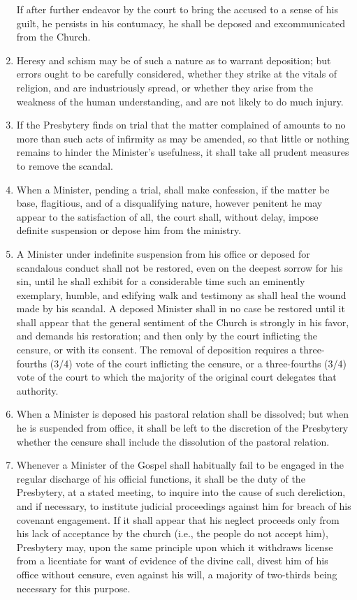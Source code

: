\documentclass[
]{book}
\begin{document}
\begin{enumerate}
  If after further endeavor by the court to bring the accused to a sense of his guilt, he persists in his contumacy, he shall be deposed and excommunicated from the Church.
\item
  Heresy and schism may be of such a nature as to warrant deposition; but errors ought to be carefully considered, whether they strike at the vitals of religion, and are industriously spread, or whether they arise from the weakness of the human understanding, and are not likely to do much injury.
\item
  If the Presbytery finds on trial that the matter complained of amounts to no more than such acts of infirmity as may be amended, so that little or nothing remains to hinder the Minister's usefulness, it shall take all prudent measures to remove the scandal.
\item
  When a Minister, pending a trial, shall make confession, if the matter be base, flagitious, and of a disqualifying nature, however penitent he may appear to the satisfaction of all, the court shall, without delay, impose definite suspension or depose him from the ministry.
\item
  \protect\hypertarget{37.8}{\href{}{}}A Minister under indefinite suspension from his office or deposed for scandalous conduct shall not be restored, even on the deepest sorrow for his sin, until he shall exhibit for a considerable time such an eminently exemplary, humble, and edifying walk and testimony as shall heal the wound made by his scandal. A deposed Minister shall in no case be restored until it shall appear that the general sentiment of the Church is strongly in his favor, and demands his restoration; and then only by the court inflicting the censure, or with its consent. The removal of deposition requires a three-fourths (3/4) vote of the court inflicting the censure, or a three-fourths (3/4) vote of the court to which the majority of the original court delegates that authority.
\item
  When a Minister is deposed his pastoral relation shall be dissolved; but when he is suspended from office, it shall be left to the discretion of the Presbytery whether the censure shall include the dissolution of the pastoral relation.
\item
  \protect\hypertarget{37.10}{\href{}{}}Whenever a Minister of the Gospel shall habitually fail to be engaged in the regular discharge of his official functions, it shall be the duty of the Presbytery, at a stated meeting, to inquire into the cause of such dereliction, and if necessary, to institute judicial proceedings against him for breach of his covenant engagement. If it shall appear that his neglect proceeds only from his lack of acceptance by the church (i.e., the people do not accept him), Presbytery may, upon the same principle upon which it withdraws license from a licentiate for want of evidence of the divine call, divest him of his office without censure, even against his will, a majority of two-thirds being necessary for this purpose.


\end{enumerate}
\end{document}
